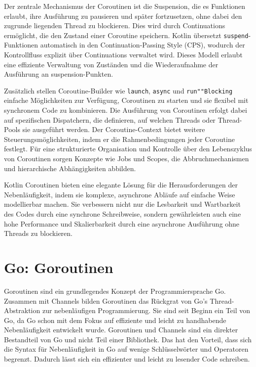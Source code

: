 \documentclass[fontsize=12pt,paper=a4,twoside=semi,parskip=half-,headsepline,headinclude]{scrreprt}
\begin{document}
Der zentrale Mechanismus der Coroutinen ist die Suspension, die es Funktionen erlaubt, ihre Ausführung zu pausieren und später fortzusetzen, ohne dabei den zugrunde liegenden Thread zu blockieren. Dies wird durch Continuations ermöglicht, die den Zustand einer Coroutine speichern. Kotlin übersetzt \texttt{suspend}-Funktionen automatisch in den Continuation-Passing Style (CPS), wodurch der Kontrollfluss explizit über Continuations verwaltet wird. Dieses Modell erlaubt eine effiziente Verwaltung von Zuständen und die Wiederaufnahme der Ausführung an suspension-Punkten.

Zusätzlich stellen Coroutine-Builder wie \texttt{launch}, \texttt{async} und \texttt{run""Blocking} einfache Mög\-lich\-kei\-ten zur Verfügung, Coroutinen zu starten und sie flexibel mit synchronem Code zu kombinieren. Die Ausführung von Coroutinen erfolgt dabei auf spezifischen Dispatchern, die definieren, auf welchen Threads oder Thread-Pools sie ausgeführt werden. Der Coroutine-Context bietet weitere Steuerungsmöglichkeiten, indem er die Rahmenbedingungen jeder Coroutine festlegt. Für eine strukturierte Organisation und Kontrolle über den Lebenszyklus von Coroutinen sorgen Konzepte wie Jobs und Scopes, die Abbruchmechanismen und hierarchische Abhängigkeiten abbilden.

Kotlin Coroutinen bieten eine elegante Lösung für die Herausforderungen der Ne\-ben\-läu\-fig\-keit, indem sie komplexe, asynchrone Abläufe auf einfache Weise modellierbar machen. Sie verbessern nicht nur die Lesbarkeit und Wartbarkeit des Codes durch eine synchrone Schreibweise, sondern gewährleisten auch eine hohe Performance und Skalierbarkeit durch eine asynchrone Ausführung ohne Threads zu blockieren.

\newpage

\section{Go: Goroutinen}

Goroutinen sind ein grundlegendes Konzept der Programmiersprache Go. Zusammen mit Channels bilden Goroutinen das Rückgrat von Go's Thread-Abstraktion zur nebenläufigen Programmierung. Sie sind seit Beginn ein Teil von Go, da Go schon mit dem Fokus auf effiziente und leicht zu handhabende Nebenläufigkeit entwickelt wurde. Goroutinen und Channels sind ein direkter Bestandteil von Go und nicht Teil einer Bibliothek. Das hat den Vorteil, dass sich die Syntax für Nebenläufigkeit in Go auf wenige Schlüsselwörter und Operatoren begrenzt. Dadurch lässt sich ein effizienter und leicht zu lesender Code schreiben.
\end{document}
